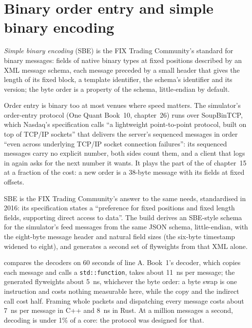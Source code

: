\section{Binary order entry and simple binary encoding}

\begin{definition}\label{def:ll:protocols-ii-binary-exchange-protocols:sbe}
\emph{Simple binary encoding} (SBE) is the FIX Trading Community's standard for binary messages:
fields of native binary types at fixed positions described by an XML message schema, each message preceded by a small header
that gives the length of its fixed block, a template identifier, the schema's identifier and its version; the byte order is a
property of the schema, little-endian by default.
\end{definition}

Order entry is binary too at most venues where speed matters. The simulator's order-entry protocol (One Quant Book~10,
chapter~26) runs over SoupBinTCP, which Nasdaq's specification calls ``a lightweight point-to-point protocol, built on top of
TCP/IP sockets'' that delivers the server's sequenced messages in order ``even across underlying TCP/IP socket connection
failures'': its sequenced messages carry no explicit number, both sides count them, and a client that logs in again asks for
the next number it wants. It plays the part of the  of chapter~15 at a fraction of the cost: a new order is a
38-byte message with its fields at fixed offsets.

SBE is the FIX Trading Community's answer to the same needs, standardised in 2016: its specification states a ``preference
for fixed positions and fixed length fields, supporting direct access to data''. The build derives an SBE-style schema for the
simulator's feed messages from the same JSON schema, little-endian, with the eight-byte message header and natural field sizes
(the six-byte timestamp widened to eight), and generates a second set of flyweights from that XML alone.

\label{lst:ll:protocols-ii-binary-exchange-protocols:sbe}

 compares the decoders on 60 seconds of line A. Book~1's decoder,
which copies each message and calls a \texttt{std::function}, takes about \qty{11}{\nano\second} per message; the generated
flyweights about \qty{5}{\nano\second}, whichever the byte order: a byte swap is one instruction and costs nothing
measurable here, while the copy and the indirect call cost half. Framing whole packets and dispatching every message costs
about \qty{7}{\nano\second} per message in C++ and \qty{8}{\nano\second} in Rust. At a million messages a second, decoding is
under 1\% of a core: the protocol was designed for that.

